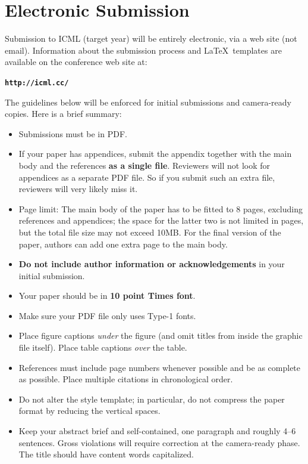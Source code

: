 \documentclass{article}
\theoremstyle{plain}
\theoremstyle{definition}
\theoremstyle{remark}
\begin{document}
\printAffiliationsAndNotice{\icmlEqualContribution} %

\begin{abstract}
This document provides a basic paper template and submission guidelines.
Abstracts must be a single paragraph, ideally between 4--6 sentences long.
Gross violations will trigger corrections at the camera-ready phase.
\end{abstract}

\section{Electronic Submission}
\label{submission}

Submission to ICML (target year) will be entirely electronic, via a web site
(not email). Information about the submission process and \LaTeX\ templates
are available on the conference web site at:
\begin{center}
\textbf{\texttt{http://icml.cc/}}
\end{center}

The guidelines below will be enforced for initial submissions and
camera-ready copies. Here is a brief summary:
\begin{itemize}
\item Submissions must be in PDF\@. 
\item If your paper has appendices, submit the appendix together with the main body and the references \textbf{as a single file}. Reviewers will not look for appendices as a separate PDF file. So if you submit such an extra file, reviewers will very likely miss it.
\item Page limit: The main body of the paper has to be fitted to 8 pages, excluding references and appendices; the space for the latter two is not limited in pages, but the total file size may not exceed 10MB. For the final version of the paper, authors can add one extra page to the main body.
\item \textbf{Do not include author information or acknowledgements} in your
    initial submission.
\item Your paper should be in \textbf{10 point Times font}.
\item Make sure your PDF file only uses Type-1 fonts.
\item Place figure captions \emph{under} the figure (and omit titles from inside
    the graphic file itself). Place table captions \emph{over} the table.
\item References must include page numbers whenever possible and be as complete
    as possible. Place multiple citations in chronological order.
\item Do not alter the style template; in particular, do not compress the paper
    format by reducing the vertical spaces.
\item Keep your abstract brief and self-contained, one paragraph and roughly
    4--6 sentences. Gross violations will require correction at the
    camera-ready phase. The title should have content words capitalized.
\end{itemize}
\end{document}

